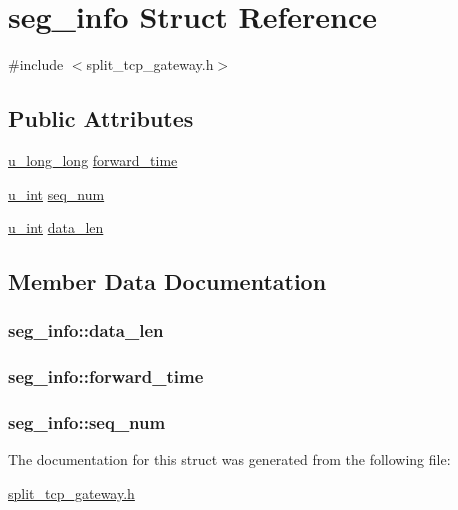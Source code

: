 \hypertarget{structseg__info}{\section{seg\-\_\-info \-Struct \-Reference}
\label{structseg__info}
}


{\ttfamily \#include $<$split\-\_\-tcp\-\_\-gateway.\-h$>$}

\subsection*{\-Public \-Attributes}
\begin{DoxyCompactItemize}
\item 
\hyperlink{split__tcp__gateway_8h_ae16666ecf73bb70201bc64a6ccc329f1}{u\-\_\-long\-\_\-long} \hyperlink{structseg__info_a1b9983539358d0f82b663b5fd818df3e}{forward\-\_\-time}
\item 
\hyperlink{split__tcp__gateway_8h_ac319c165d52643e43249fe003e18bdf3}{u\-\_\-int} \hyperlink{structseg__info_a341cccbcaba36998f1e5c1b761b1d1e6}{seq\-\_\-num}
\item 
\hyperlink{split__tcp__gateway_8h_ac319c165d52643e43249fe003e18bdf3}{u\-\_\-int} \hyperlink{structseg__info_a246933b1ef67d54e9b3da1b9806b0c5e}{data\-\_\-len}
\end{DoxyCompactItemize}


\subsection{\-Member \-Data \-Documentation}
\hypertarget{structseg__info_a246933b1ef67d54e9b3da1b9806b0c5e}{
\subsubsection[{data\-\_\-len}]{ {\bf seg\-\_\-info\-::data\-\_\-len}}}\label{structseg__info_a246933b1ef67d54e9b3da1b9806b0c5e}
\hypertarget{structseg__info_a1b9983539358d0f82b663b5fd818df3e}{
\subsubsection[{forward\-\_\-time}]{ {\bf seg\-\_\-info\-::forward\-\_\-time}}}\label{structseg__info_a1b9983539358d0f82b663b5fd818df3e}
\hypertarget{structseg__info_a341cccbcaba36998f1e5c1b761b1d1e6}{
\subsubsection[{seq\-\_\-num}]{ {\bf seg\-\_\-info\-::seq\-\_\-num}}}\label{structseg__info_a341cccbcaba36998f1e5c1b761b1d1e6}


\-The documentation for this struct was generated from the following file\-:\begin{DoxyCompactItemize}
\item 
\hyperlink{split__tcp__gateway_8h}{split\-\_\-tcp\-\_\-gateway.\-h}\end{DoxyCompactItemize}
